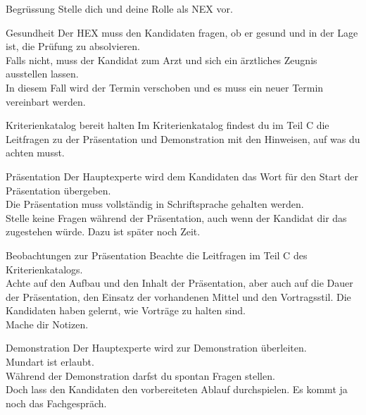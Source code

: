 \begin{taskitemwithoutcomment}{Begrüssung}
  Stelle dich und deine Rolle als NEX vor.\\
\end{taskitemwithoutcomment}  
\begin{taskitemwithoutcomment}{Gesundheit}
  Der HEX muss den Kandidaten fragen, ob er gesund und in der Lage ist, die Prüfung zu absolvieren.\\
  Falls nicht, muss der Kandidat zum Arzt und sich ein ärztliches Zeugnis ausstellen lassen.\\
  In diesem Fall wird der Termin verschoben und es muss ein neuer Termin vereinbart werden.
\end{taskitemwithoutcomment}
\begin{taskitemwithoutcomment}{Kriterienkatalog bereit halten}
  Im Kriterienkatalog findest du im Teil C die Leitfragen zu der Präsentation und Demonstration mit den Hinweisen, auf was du achten musst.
\end{taskitemwithoutcomment}
\begin{taskitemwithoutcomment}{Präsentation}
  Der Hauptexperte wird dem Kandidaten das Wort für den Start der Präsentation übergeben.\\
  Die Präsentation muss vollständig in Schriftsprache gehalten werden.\\
  Stelle keine Fragen während der Präsentation, auch wenn der Kandidat dir das zugestehen würde. Dazu ist später noch Zeit.
\end{taskitemwithoutcomment}
\begin{taskitem}{Beobachtungen zur Präsentation}
  Beachte die Leitfragen im Teil C des Kriterienkatalogs.\\
  Achte auf den Aufbau und den Inhalt der Präsentation, aber auch auf die Dauer der Präsentation, den Einsatz der vorhandenen Mittel und den Vortragsstil. Die Kandidaten haben gelernt, wie Vorträge zu halten sind.\\
  Mache dir Notizen.
\end{taskitem}
\begin{taskitemwithoutcomment}{Demonstration}
  Der Hauptexperte wird zur Demonstration überleiten.\\
  Mundart ist erlaubt.\\
  Während der Demonstration darfst du spontan Fragen stellen.\\
  Doch lass den Kandidaten den vorbereiteten Ablauf durchspielen. Es kommt ja noch das Fachgespräch. 
\end{taskitemwithoutcomment}
